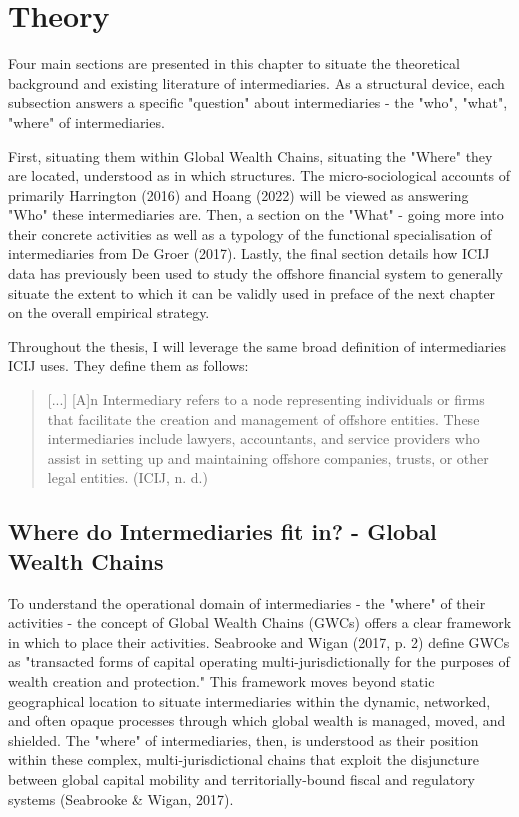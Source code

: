 \chapter{Theory}
\label{chap:theory}

Four main sections are presented in this chapter to situate the theoretical background and existing literature of intermediaries. As a structural device, each subsection answers a specific "question" about intermediaries - the "who", "what", "where" of intermediaries. 

First, situating them within Global Wealth Chains, situating the "Where" they are located, understood as in which structures. The micro-sociological accounts of primarily Harrington (2016) and Hoang (2022) will be viewed as answering "Who" these intermediaries are. Then, a section on the "What" - going more into their concrete activities as well as a typology of the functional specialisation of intermediaries from De Groer (2017). Lastly, the final section details how ICIJ data has previously been used to study the offshore financial system to generally situate the extent to which it can be validly used in preface of the next chapter on the overall empirical strategy.

Throughout the thesis, I will leverage the same broad definition of intermediaries ICIJ uses. They define them as follows:

\begin{quote}
    [...] [A]n Intermediary refers to a node representing individuals or firms that facilitate the creation and management of offshore entities. These intermediaries include lawyers, accountants, and service providers who assist in setting up and maintaining offshore companies, trusts, or other legal entities. (ICIJ, n. d.)
\end{quote}


\section{Where do Intermediaries fit in? - Global Wealth Chains}

To understand the operational domain of intermediaries - the "where" of their activities - the concept of Global Wealth Chains (GWCs) offers a clear framework in which to place their activities. Seabrooke and Wigan (2017, p. 2) define GWCs as "transacted forms of capital operating multi-jurisdictionally for the purposes of wealth creation and protection." This framework moves beyond static geographical location to situate intermediaries within the dynamic, networked, and often opaque processes through which global wealth is managed, moved, and shielded. The "where" of intermediaries, then, is understood as their position within these complex, multi-jurisdictional chains that exploit the disjuncture between global capital mobility and territorially-bound fiscal and regulatory systems (Seabrooke \& Wigan, 2017).

